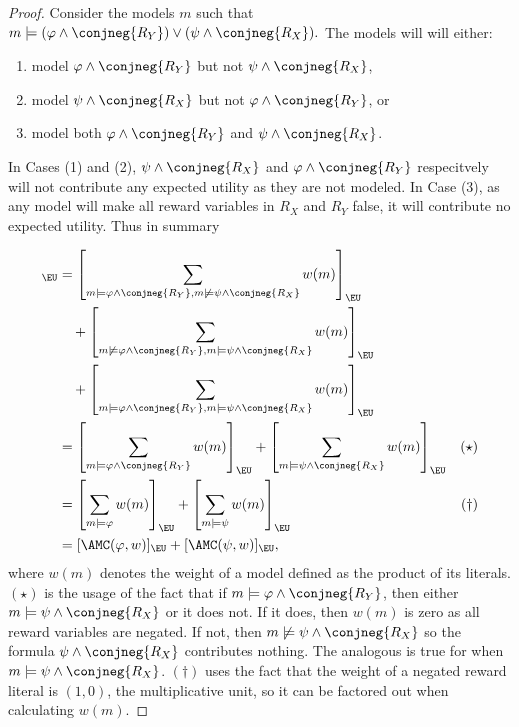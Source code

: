 \begin{proof}
  Consider the models $m$ such that
    $m \models (\varphi \land \conjneg{R_Y} )
    \lor (\psi \land \conjneg{R_X}).$
  The models will will either:
  \begin{enumerate}
    \item model $\varphi \land \conjneg{R_Y}$
    but not $\psi \land \conjneg{R_X}$,
    \item model $\psi \land \conjneg{R_X}$
    but not $\varphi \land \conjneg{R_Y}$, or
    \item model both $\varphi \land \conjneg{R_Y}$
    and $\psi \land \conjneg{R_X}$.
  \end{enumerate}
  In Cases (1) and (2), $\psi \land \conjneg{R_X}$
  and $\varphi \land \conjneg{R_Y}$ respecitvely will not
  contribute any expected utility as they are not modeled.
  In Case (3), as any model will make all reward variables in
  $R_X$ and $R_Y$ false, it will contribute no expected utility.
  Thus in summary

  \begin{align*}
    [\AMC((\varphi \land \conjneg{R_Y})
    \lor (\psi \land \conjneg{R_X}), w)]_{\EU}
    &= \left[\sum_{m \models \varphi \land \conjneg{R_Y},
        m \not\models \psi \land \conjneg{R_X}} w(m)\right]_{\EU} \\
    &\quad + \left[\sum_{m \not\models \varphi \land \conjneg{R_Y},
        m \models \psi \land \conjneg{R_X}} w(m)\right]_{\EU} \\
    &\quad + \left[\sum_{m \models \varphi \land \conjneg{R_Y},
        m \models \psi \land \conjneg{R_X}} w(m)\right]_{\EU} \\
    &= \left[\sum_{m \models \varphi \land \conjneg{R_Y}} w(m)\right]_{\EU}
      + \left[\sum_{
        m \models \psi \land \conjneg{R_X}} w(m)\right]_{\EU} &(\star)\\
    &= \left[\sum_{m \models \varphi} w(m)\right]_{\EU}
      + \left[\sum_{
        m \models \psi} w(m)\right]_{\EU} &(\dagger)\\
    &= [\AMC(\varphi,w)]_{\EU} + [\AMC(\psi, w)]_{\EU}, 
  \end{align*}
  where $w(m)$ denotes the weight of a model defined as the product of its literals. $(\star)$ is the usage of the fact that if 
  $m \models \varphi \land \conjneg{R_Y}$,
  then either $m \models \psi \land \conjneg{R_X}$ or it does not.
  If it does, then $w(m)$ is zero as all reward variables are negated.
  If not, then $m \not\models \psi \land \conjneg{R_X}$ so the formula 
  $\psi \land \conjneg{R_X}$ contributes nothing. The analogous is true 
  for when $m \models \psi \land \conjneg{R_X}$.
  $(\dagger)$ uses the fact that the weight of a negated
  reward literal is $(1,0)$, the multiplicative unit, so
  it can be factored out when calculating $w(m)$.
\end{proof}

